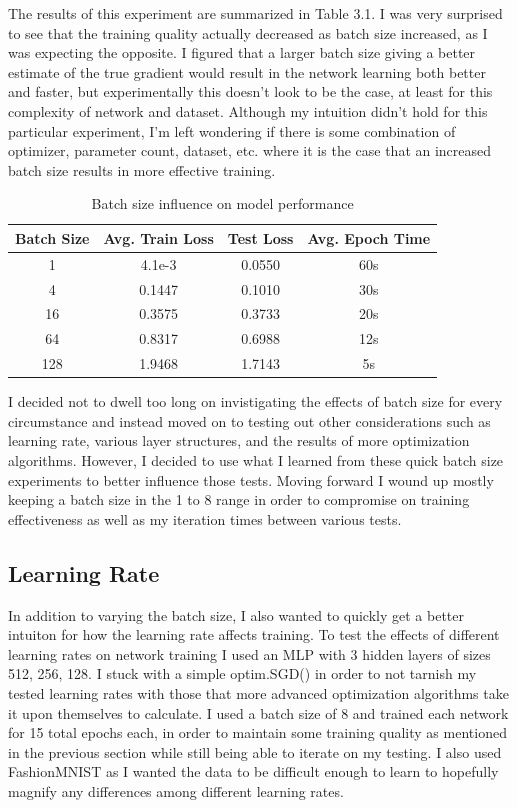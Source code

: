 \documentclass[12pt, twoside]{report}
\begin{document}
The results of this experiment are summarized in Table 3.1.
I was very surprised to see that the training quality actually decreased as batch size increased, 
as I was expecting the opposite. I figured that a larger batch size giving
a better estimate of the true gradient would result in the network learning both better and faster, but 
experimentally this doesn't look to be the case, at least for this complexity of network and dataset.
Although my intuition didn't hold for this particular experiment, I'm left wondering if there is some
combination of optimizer, parameter count, dataset, etc. where it is the case that an increased batch size
results in more effective training.

\begin{table}[h]
    \centering
    \begin{tabular}{|c|c|c|c|}
    \hline
     Batch Size & Avg. Train Loss & Test Loss & Avg. Epoch Time \\
    \hline
    1 & 4.1e-3 & 0.0550 & 60s \\
    \hline
    4 & 0.1447 & 0.1010 & 30s \\
    \hline
    16 & 0.3575 & 0.3733 & 20s \\
    \hline
    64 & 0.8317 & 0.6988 & 12s \\
    \hline
    128 & 1.9468 & 1.7143 & 5s \\
    \hline
    \end{tabular}
    \caption{Batch size influence on model performance}
\end{table}

I decided not to dwell too long on invistigating the effects of batch size for every circumstance
and instead moved on to testing out other considerations such as learning rate, various layer structures,
and the results of more optimization algorithms. However, I decided to use what I learned from these
quick batch size experiments to better influence those tests. Moving forward I wound up mostly keeping a 
batch size in the 1 to 8 range in order to compromise on training effectiveness as well as my iteration 
times between various tests.

\subsection{Learning Rate}

In addition to varying the batch size, I also wanted to quickly get a better 
intuiton for how the learning rate affects training.
To test the effects of different learning rates on network training 
I used an MLP with 3 hidden layers of sizes 512, 256, 128.
I stuck with a simple optim.SGD() in order to not tarnish my tested learning rates
with those that more advanced optimization algorithms take it upon themselves to calculate.
I used a batch size of 8 and trained each network for 15 total epochs each, 
in order to maintain some training quality as mentioned in the previous
section while still being able to iterate on my testing. I also used FashionMNIST as I wanted the data
to be difficult enough to learn to hopefully magnify any differences among different learning rates.
\end{document}
